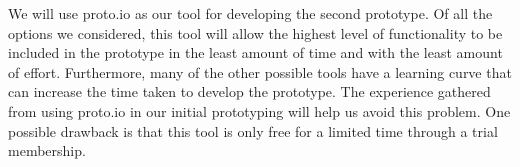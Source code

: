 We will use proto.io as our tool for developing the second prototype. Of all
the options we considered, this tool will allow the highest level of
functionality to be included in the prototype in the least amount of time and
with the least amount of effort. Furthermore, many of the other possible tools
have a learning curve that can increase the time taken to develop the
prototype. The experience gathered from using proto.io in our initial
prototyping will help us avoid this problem. One possible drawback is that this
tool is only free for a limited time through a trial membership.

\restoregeometry%
